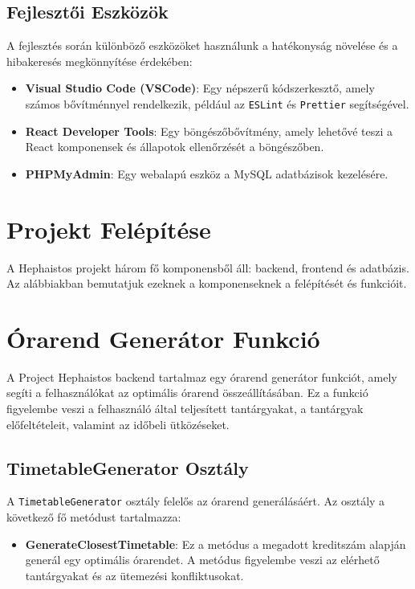 \documentclass[colorlinks]{thesis-kando}
\theoremstyle{definition}
\theoremstyle{remark}
\begin{document}
\subsection{Fejlesztői Eszközök}
A fejlesztés során különböző eszközöket használunk a hatékonyság növelése és a hibakeresés megkönnyítése érdekében:
\begin{itemize}
    \item \textbf{Visual Studio Code (VSCode)}: Egy népszerű kódszerkesztő, amely számos bővítménnyel rendelkezik, például az \texttt{ESLint} és \texttt{Prettier} segítségével.
    \item \textbf{React Developer Tools}: Egy böngészőbővítmény, amely lehetővé teszi a React komponensek és állapotok ellenőrzését a böngészőben.
    \item \textbf{PHPMyAdmin}: Egy webalapú eszköz a MySQL adatbázisok kezelésére.
\end{itemize}

\section{Projekt Felépítése}
A Hephaistos projekt három fő komponensből áll: backend, frontend és adatbázis. Az alábbiakban bemutatjuk ezeknek a komponenseknek a felépítését és funkcióit.

\section{Órarend Generátor Funkció}
A Project Hephaistos backend tartalmaz egy órarend generátor funkciót, amely segíti a felhasználókat az optimális órarend összeállításában. Ez a funkció figyelembe veszi a felhasználó által teljesített tantárgyakat, a tantárgyak előfeltételeit, valamint az időbeli ütközéseket.

\subsection{TimetableGenerator Osztály}
A \texttt{TimetableGenerator} osztály felelős az órarend generálásáért. Az osztály a következő fő metódust tartalmazza:

\begin{itemize}
    \item \textbf{GenerateClosestTimetable}: Ez a metódus a megadott kreditszám alapján generál egy optimális órarendet. A metódus figyelembe veszi az elérhető tantárgyakat és az ütemezési konfliktusokat.
\end{itemize}
\end{document}
